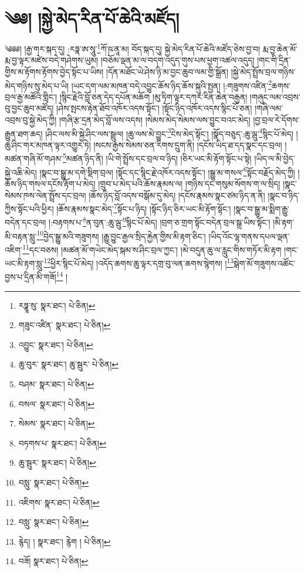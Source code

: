 \setcounter{footnote}{0} 
\chapter{༄༅། །སྐྱེ་མེད་རིན་པོ་ཆེའི་མཛོད།}༄༅༅། །རྒྱ་གར་སྐད་དུ། :རཏྣ་ཨ་སཱུ་\footnote{རཏྣཱ་སུ་  སྣར་ཐང་།  པེ་ཅིན། }ཀོ་ཥ་ནཱ་མ། བོད་སྐད་དུ། སྐྱེ་མེད་རིན་པོ་ཆེའི་མཛོད་ཅེས་བྱ་བ། རྨ་བྱ་ཆེན་མོ་རྨ་བྱ་ལྟར་མཛེས་བདེ་གཤེགས་ཡུམ། །བཅོམ་ལྡན་མ་ལ་བདག་འདུད་གུས་པས་ཕྱག་འཚལ་འདུད། །གང་གི་དྲིན་གྱིས་མ་རྟོགས་རྟོགས་བྱེད་སྟོང་པ་ཡིས། །དོན་མཐོང་ཡེ་ཤེས་ཉི་མ་བྱང་ཆུབ་ལམ་གྱི་སྒྲོན། །སྐྱེ་མེད་སྤྲོས་བྲལ་གཉིས་མེད་གཉིས་སུ་མེད་པ་ཡི། །ཡང་དག་ལམ་མཁན་བདེ་འབྱུང་ཆོས་ཉིད་ཆོས་སྐུའི་སྤྱན། །:གཟུགས་འཛིན་\footnote{གཟུང་འཛིན་  སྣར་ཐང་།  པེ་ཅིན། }ཆགས་བྲལ་རྒྱ་མཚོའི་གླིང་། །སྙིང་རྗེའི་བློ་ཅན་དེད་དཔོན་མཆོག །མུ་ཏིག་ལྟར་དཀར་རིན་ཆེན་བརྒྱན། །གཞུང་ལམ་འབྲས་བུ་བྱང་ཆུབ་མཛོད། །ཤེས་སྤངས་རྟེན་ཐོབ་འཁོར་འདས་སྟོང་། །སྟོང་ཉིད་འཁོར་འདས་སྙིང་པོ་ཅན། །གཞི་ལམ་འབྲས་བུ་སྐྱེ་མེད་ཀྱི། །གཞི་རྩ་དྲན་མེད་བློ་ལས་འདས། །སེམས་མེད་སེམས་ལས་བྱུང་བའང་མེད། །བྱ་བྲལ་རེ་དོགས་རྒྱུན་ཐག་ཆད། །ཤིང་ལས་མི་སྐྱེ་ཤིང་ལས་སྦྲུལ། །ཆུ་ལས་མེ་བྱུང་\footnote{འབྱུང་  སྣར་ཐང་།  པེ་ཅིན། }ངེས་མེད་སྟོང་། །སྣོད་བཅུད་:ཆུ་ལྦུ་\footnote{ཆུ་བུར་  སྣར་ཐང་། ཆུ་སྦུར་  པེ་ཅིན། }སྙིང་པོ་མེད། །ཆུ་ཤིང་གར་མཁན་ལྟར་འགྱུར་ཏེ། །སངས་རྒྱས་སེམས་ཅན་རིགས་དྲུག་ནི། །དངོས་ཡིད་ཐ་དད་སྣང་དང་བྲལ། །མཚན་གཞི་མོ་གཤམ་\footnote{བཤམ་  སྣར་ཐང་།  པེ་ཅིན། }མཚན་ཉིད་ནི། །ཡི་གེ་སྤྲོས་དང་བྲལ་བ་ཉིད། །ཅིར་ཡང་མི་རྟོག་སྟོང་པ་སྟེ། །ཡིད་ལ་མི་བྱེད་སྐྱེ་འཆི་མེད། །སྣང་བ་སྒྱུ་མ་དགེ་སྡིག་བྲལ། །སྟོང་དང་སྙིང་རྗེ་འཁོར་འདས་སྟོང་། །སྒྱུ་མ་གསལ་\footnote{བསལ་  སྣར་ཐང་།  པེ་ཅིན། }སྟོང་བརྗོད་མེད་ཀྱི། །ཆོས་ཉིད་གསལ་དངོས་རྟོག་པ་མེད། །གྲུབ་པ་མེད་པའི་ཆོས་རྣམས་ལ། །གཉིས་དང་གསུམ་སོགས་ག་ལ་སྲིད། །སྣང་སེམས་ཁས་ལེན་སྤྲོས་དང་བྲལ། །ཆོས་ཉིད་བློ་འདས་བསྒོམ་དུ་མེད། །དངོས་རྣམས་སྣང་ཙམ་ཉིད་ན་ནི། །སྣང་བ་ཉིད་ཀྱིས་སྟོང་པའི་ཕྱིར། །ཆོས་རྣམས་སྣང་མེད་\footnote{སེམས་  སྣར་ཐང་།  པེ་ཅིན། }སྟོང་པ་ཉིད། །སྟོང་ཉིད་ཅིར་ཡང་མི་རྟོག་སྟོང་། །སྣང་བ་སྒྱུ་མ་སྨིག་རྒྱུ་བདེན་དང་བྲལ། །:བརྟགས་པ་\footnote{བཏགས་པ་  སྣར་ཐང་།  པེ་ཅིན། }ན་བུན་:ཆུ་ལྦུ་\footnote{ཆུ་སྦུར་  སྣར་ཐང་།  པེ་ཅིན། }སྙིང་པོ་མེད། །བྲག་ཅ་གྲག་སྟོང་བདེན་བྲལ་སྒྲ་ཡིས་སྟོང་། །མི་རྟག་མི་བརྟན་སླུ་\footnote{བསླུ་  སྣར་ཐང་།  པེ་ཅིན། }བྱེད་སྒྱུ་མའི་གཟུགས། །རྒྱུ་བྱུང་རྒྱལ་སྲིད་རྐྱེན་གྱིས་མི་རྟག་ཅིང་། །ཡིད་འོང་ལྷ་གནས་དཔལ་ལྡན་འཇིག་\footnote{འཇིགས་  སྣར་ཐང་།  པེ་ཅིན། }དང་བཅས། །མཚན་མོ་གཡེང་མེད་སྐམ་ས་ཤིང་བྲལ་ཀྱང་། །མེ་བདུན་ཆུ་ལ་རླུང་གིས་གཏོར་མི་རྟག །གང་ཡང་མི་རྟག་སླུ་\footnote{བསླུ་  སྣར་ཐང་།  པེ་ཅིན། }ཕྱིར་སྙིང་པོ་མེད། །འདོད་ཆགས་ཆུ་ལྟར་དགྲ་བུ་ལན་ཆགས་སྙེགས། །\footnote{རྙེད། །  སྣར་ཐང་། རྙེག །  པེ་ཅིན། }སྒེག་མོ་གཟུགས་འཚོང་བྱས་པ་དྲིན་མི་གཟོ།\footnote{བཟོ།  སྣར་ཐང་།  པེ་ཅིན། } །
